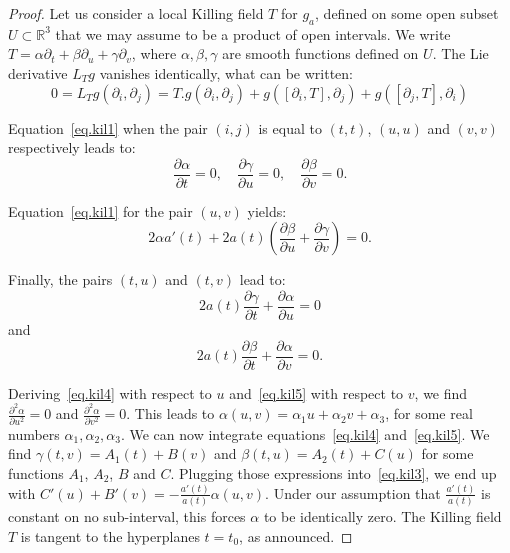 \documentclass[11pt]{article}
\theoremstyle{definition}
\numberwithin{equation}{section}
\numberwithin{figure}{section}
\numberwithin{table}{section}
\newcommand*\RR{\mathbb{R}}
\begin{document}
\begin{proof}
Let us consider a local Killing field $T$ for $g_a$, defined on some open subset $U \subset \RR^3$ that we may assume to be a product of open intervals. We write $T=\alpha \partial_t + \beta \partial_u + \gamma \partial_v$, where $\alpha, \beta, \gamma$ are smooth functions defined on $U$. The Lie derivative $L_Tg$ vanishes identically, what can be written:
\begin{equation}\label{eq.kil1}
0=L_Tg(\partial_i,\partial_j)=T.g(\partial_i,\partial_j)+g([\partial_i,T],\partial_j)+ g([\partial_j,T],\partial_i)
\end{equation}

Equation~\eqref{eq.kil1} when the pair $(i,j)$ is equal to $(t,t)$, $(u,u)$ and $(v,v)$ respectively leads to:
\begin{equation}\label{eq.kil2}
\frac{\partial \alpha}{\partial t}=0, \quad \frac{\partial \gamma}{\partial u}=0, \quad \frac{\partial \beta}{\partial v}=0.
\end{equation}

Equation~\eqref{eq.kil1} for the pair $(u,v)$ yields:
\begin{equation}\label{eq.kil3}
2 \alpha a'(t)+2 a(t)\left(\frac{\partial \beta}{\partial u}+ \frac{\partial \gamma}{\partial v}\right)=0.
\end{equation}

Finally, the pairs $(t,u)$ and $(t,v)$ lead to:
\begin{equation}\label{eq.kil4}
2 a(t) \frac{\partial \gamma}{\partial t}+ \frac{\partial \alpha}{\partial u}=0
\end{equation}
and
\begin{equation}\label{eq.kil5}
2 a(t) \frac{\partial \beta}{\partial t}+ \frac{\partial \alpha}{\partial v}=0.
\end{equation}

Deriving~\eqref{eq.kil4} with respect to $u$ and~\eqref{eq.kil5} with respect to $v$, we find $\frac{\partial^2 \alpha}{\partial u^2}=0$ and $\frac{\partial^2 \alpha}{\partial v^2}=0$. This leads to $\alpha(u,v)=\alpha_1 u + \alpha_2 v+ \alpha_3$, for some real numbers $\alpha_1, \alpha_2, \alpha_3$. We can now integrate equations~\eqref{eq.kil4} and~\eqref{eq.kil5}. We find $\gamma(t,v)=A_1(t)+B(v)$ and $\beta(t,u)=A_2(t)+C(u)$ for some functions $A_1$, $A_2$, $B$ and $C$. Plugging those expressions into~\eqref{eq.kil3}, we end up with $C'(u)+B'(v)=-\frac{a'(t)}{a(t)}\alpha(u,v)$. Under our assumption that $\frac{a'(t)}{a(t)}$ is constant on no sub-interval, this forces $\alpha$ to be identically zero. The Killing field $T$ is tangent to the hyperplanes $t=t_0$, as announced.


\end{proof}
\end{document}
